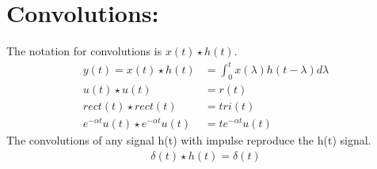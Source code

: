 \documentclass[13pt,a4paper]{article}
\begin{document}
\section{Convolutions:}
The notation for convolutions is $x(t)\star h(t)$.
\begin{align*}
    y(t) =x(t)\star h(t) &=\int_{0}^{t}x(\lambda)h(t-\lambda)d\lambda\\
    u(t)\star u(t) &=r(t)\\
    rect(t)\star rect(t) &=tri(t)\\
    e^{-\alpha t}u(t) \star e^{-\alpha t}u(t) &=te^{-\alpha t}u(t)
\end{align*}
The convolutions of any signal h(t) with impulse reproduce the h(t) signal.
\begin{gather*}
    \delta(t)\star h(t)=\delta(t)
\end{gather*}
\end{document}
